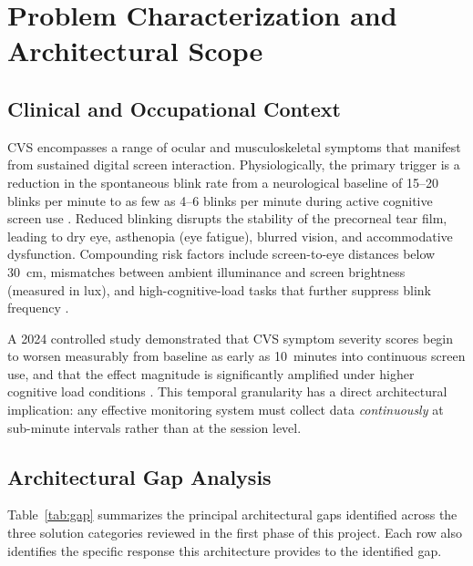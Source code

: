 \documentclass[conference]{IEEEtran}
\begin{document}
\section{Problem Characterization and Architectural Scope}

\subsection{Clinical and Occupational Context}

CVS encompasses a range of ocular and musculoskeletal symptoms that manifest from
sustained digital screen interaction. Physiologically, the primary trigger is a
reduction in the spontaneous blink rate from a neurological baseline of 15--20 blinks
per minute to as few as 4--6 blinks per minute during active cognitive screen use
\cite{b2}. Reduced blinking disrupts the stability of the precorneal tear film, leading
to dry eye, asthenopia (eye fatigue), blurred vision, and accommodative dysfunction.
Compounding risk factors include screen-to-eye distances below 30~cm, mismatches between
ambient illuminance and screen brightness (measured in lux), and high-cognitive-load tasks
that further suppress blink frequency \cite{b3,b18}.

A 2024 controlled study demonstrated that CVS symptom severity scores begin to worsen
measurably from baseline as early as 10~minutes into continuous screen use, and that the
effect magnitude is significantly amplified under higher cognitive load conditions
\cite{b18}. This temporal granularity has a direct architectural implication: any
effective monitoring system must collect data \emph{continuously} at sub-minute intervals
rather than at the session level.

\subsection{Architectural Gap Analysis}

Table~\ref{tab:gap} summarizes the principal architectural gaps identified across the
three solution categories reviewed in the first phase of this project. Each row also
identifies the specific response this architecture provides to the identified gap.
\end{document}
